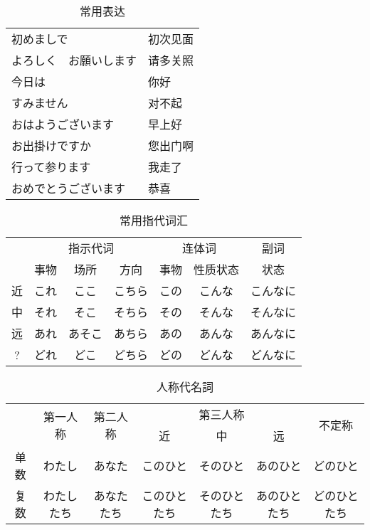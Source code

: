\begin{table}[h]
  \centering
  \caption{常用表达}
  \label{tab:label}
  \small
  \begin{tabular}{ll}
    初めましで & 初次见面 \\
    よろしく　お願いします & 请多关照 \\
    今日は & 你好 \\
    すみません & 对不起 \\
    おはようございます & 早上好 \\
    お出掛けですか & 您出门啊 \\
    行って参ります & 我走了 \\
    おめでとうございます & 恭喜 \\
  \end{tabular}
\end{table}

\begin{table}[h]
  \centering
  \caption{常用指代词汇}
  \label{tab:label}
  \small
  \begin{tabular}{c|ccc|cc|c}
    & \multicolumn{3}{c|}{指示代词} & \multicolumn{2}{c|}{连体词} & 副词 \\
    & 事物 & 场所 & 方向 & 事物 & 性质状态 & 状态 \\
    \hline
    近 & これ & ここ   & こちら & この & こんな & こんなに \\
    中 & それ & そこ   & そちら & その & そんな & そんなに \\
    远 & あれ & あそこ & あちら & あの & あんな & あんなに \\
    ?  & どれ & どこ   & どちら & どの & どんな & どんなに \\
  \end{tabular}
\end{table}

\begin{table}[h]
  \centering
  \caption{人称代名詞}
  \label{tab:label}
  \small
  \begin{tabular}{c|c|c|ccc|c}
    & \multirow{2}{*}{第一人称} & \multirow{2}{*}{第二人称} & \multicolumn{3}{c|}{第三人称} & \multirow{2}{*}{不定称} \\
    & & & 近 & 中 & 远 & \\
    \hline
    单数 & わたし & あなた & このひと & そのひと & あのひと & どのひと \\
    复数 &わたしたち & あなたたち & このひとたち & そのひとたち & あのひとたち & どのひとたち \\
  \end{tabular}
\end{table}

